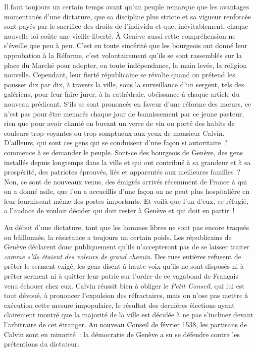 \documentclass[french,twoside]{book} %
\newcommand{\astermono}{\medskip\centerline{\color{rubric}\large\selectfont{\syms ✻}}\medskip\par}%
\begin{document}
\astermono

\noindent Il faut toujours un certain temps avant qu’un peuple remarque que les avantages momentanés d’une dictature, que sa discipline plus stricte et sa vigueur renforcée sont payés par le sacrifice des droits de l’individu et que, inévitablement, chaque nouvelle loi coûte une vieille liberté. À Genève aussi cette compréhension ne s’éveille que peu à peu. C’est en toute sincérité que les bourgeois ont donné leur approbation à la Réforme, c’est volontairement qu’ils se sont rassemblés sur la place du Marché pour adopter, en toute indépendance, la main levée, la religion nouvelle. Cependant, leur fierté républicaine se révolte quand on prétend les pousser dix par dix, à travers la ville, sous la surveillance d’un sergent, tels des galériens, pour leur faire jurer, à la cathédrale, obéissance à chaque article du nouveau prédicant. S’ils se sont prononcés en faveur d’une réforme des mœurs, ce n’est pas pour être menacés chaque jour de bannissement par ce jeune pasteur, rien que pour avoir chanté en buvant un verre de vin ou porté des habits de couleurs trop voyantes ou trop somptueux aux yeux de monsieur Calvin. D’ailleurs, qui sont ces gens qui se conduisent d’une façon si autoritaire ? commence à se demander le peuple. Sont-ce des bourgeois de Genève, des gens installés depuis longtemps dans la ville et qui ont contribué à sa grandeur et à sa prospérité, des patriotes éprouvés, liés et apparentés aux meilleures familles ? Non, ce sont de nouveaux venus, des émigrés arrivés récemment de France à qui on a donné asile, que l’on a accueillis d’une façon on ne peut plus hospitalière en leur fournissant même des postes importants. Et voilà que l’un d’eux, ce réfugié, a l’audace de vouloir décider qui doit rester à Genève et qui doit en partir !\par
Au début d’une dictature, tant que les hommes libres ne sont pas encore traqués ou bâillonnés, la résistance a toujours un certain poids. Les républicains de Genève déclarent donc publiquement qu’ils n’accepteront pas de se laisser traiter \emph{comme s’ils étaient des voleurs de grand chemin}. Des rues entières refusent de prêter le serment exigé, les gens disent à haute voix qu’ils ne sont disposés ni à prêter serment ni à quitter leur patrie sur l’ordre de ce vagabond de Français venu échouer chez eux. Calvin réussit bien à obliger le \emph{Petit Conseil}, qui lui est tout dévoué, à prononcer l’expulsion des réfractaires, mais on n’ose pas mettre à exécution cette mesure impopulaire, le résultat des dernières élections ayant clairement montré que la majorité de la ville est décidée à ne pas s’incliner devant l’arbitraire de cet étranger. Au nouveau Conseil de février 1538, les partisans de Calvin sont en minorité : la démocratie de Genève a su se défendre contre les prétentions du dictateur.\par
\end{document}
